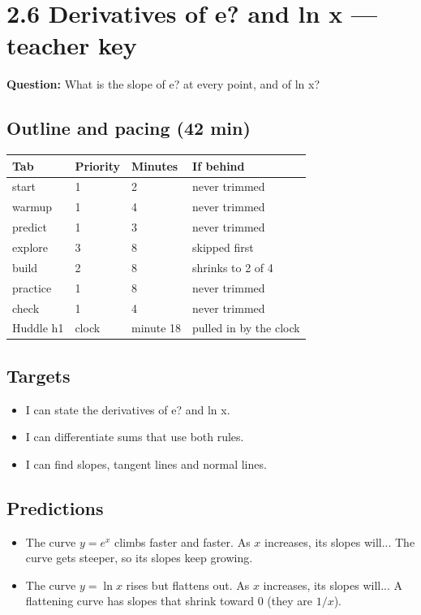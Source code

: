 \documentclass[11pt]{article}
\begin{document}
\section*{2.6 Derivatives of e? and ln x --- teacher key}
\textbf{Question:} What is the slope of e? at every point, and of ln x?\par
\subsection*{Outline and pacing (42 min)}\begin{tabular}{@{}llll@{}}\toprule Tab & Priority & Minutes & If behind\\\midrule
start & 1 & 2 & never trimmed\\
warmup & 1 & 4 & never trimmed\\
predict & 1 & 3 & never trimmed\\
explore & 3 & 8 & skipped first\\
build & 2 & 8 & shrinks to 2 of 4\\
practice & 1 & 8 & never trimmed\\
check & 1 & 4 & never trimmed\\
Huddle h1 & clock & minute 18 & pulled in by the clock\\
\bottomrule\end{tabular}
\subsection*{Targets}\begin{itemize}\item I can state the derivatives of e? and ln x.
\item I can differentiate sums that use both rules.
\item I can find slopes, tangent lines and normal lines.\end{itemize}
\subsection*{Predictions}\begin{itemize}
\item The curve $y=e^x$ climbs faster and faster. As $x$ increases, its slopes will...  The curve gets steeper, so its slopes keep growing.
\item The curve $y=\ln x$ rises but flattens out. As $x$ increases, its slopes will...  A flattening curve has slopes that shrink toward 0 (they are $1/x$).
\end{itemize}
\end{document}
